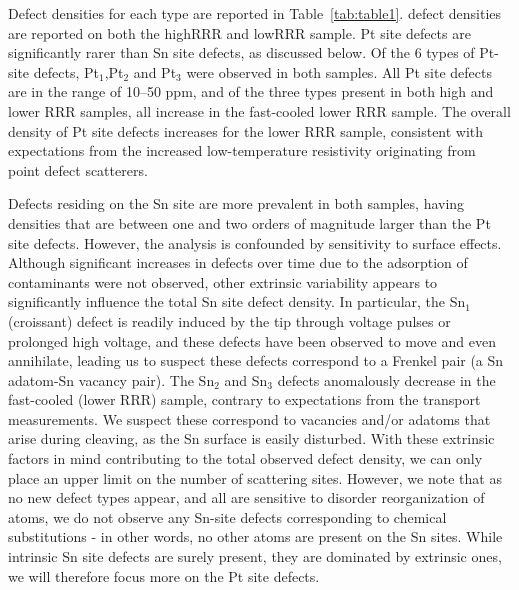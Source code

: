 \par Defect densities for each type are reported in Table~\ref{tab:table1}. defect densities are reported on both the highRRR and lowRRR sample. Pt site defects are significantly rarer than Sn site defects, as discussed below. Of the 6 types of Pt-site defects, Pt$_{1}$,Pt$_{2}$ and Pt$_{3}$ were observed in both samples. All Pt site defects are in the range of 10--50 ppm, and of the three types present in both high and lower RRR samples, all increase in the fast-cooled lower RRR sample. The overall density of Pt site defects increases for the lower RRR sample, consistent with expectations from the increased low-temperature resistivity originating from point defect scatterers.

\par Defects residing on the Sn site are more prevalent in both samples, having densities that are between one and two orders of magnitude larger than the Pt site defects. However, the analysis is confounded by sensitivity to surface effects. Although significant increases in defects over time due to the adsorption of contaminants were not observed, other extrinsic variability appears to significantly influence the total Sn site defect density. In particular, the Sn$_1$ (croissant) defect is readily induced by the tip through voltage pulses or prolonged high voltage, and these defects have been observed to move and even annihilate, leading us to suspect these defects correspond to a Frenkel pair (a Sn adatom-Sn vacancy pair). The Sn$_2$ and Sn$_3$ defects anomalously decrease in the fast-cooled (lower RRR) sample, contrary to expectations from the transport measurements. We suspect these correspond to vacancies and/or adatoms that arise during cleaving, as the Sn surface is easily disturbed. With these extrinsic factors in mind contributing to the total observed defect density, we can only place an upper limit on the number of scattering sites. However, we note that as no new defect types appear, and all are sensitive to disorder reorganization of atoms, we do not observe any Sn-site defects corresponding to chemical substitutions - in other words, no other atoms are present on the Sn sites. While intrinsic Sn site defects are surely present, they are dominated by extrinsic ones, we will therefore focus more on the Pt site defects.

